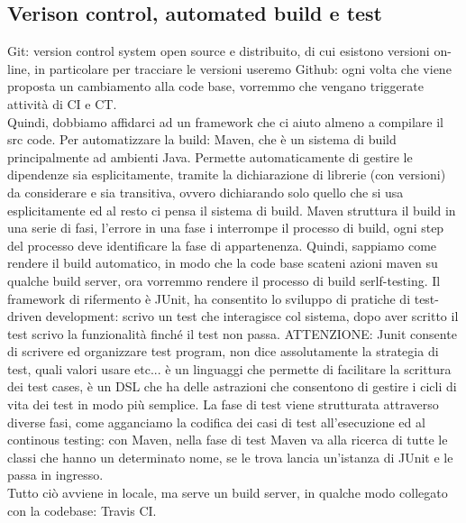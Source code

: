 \documentclass{article}
\begin{document}
\subsection{Verison control, automated build e test}
Git: version control system open source e distribuito, di cui esistono versioni on-line, in particolare per tracciare le versioni useremo Github: ogni volta che viene proposta un cambiamento alla code base, vorremmo che vengano triggerate attività di CI e CT.\\ Quindi, dobbiamo affidarci ad un framework che ci aiuto almeno a compilare il src code. Per automatizzare la build: Maven, che è un sistema di build principalmente ad ambienti Java. Permette automaticamente di gestire le dipendenze sia esplicitamente, tramite la dichiarazione di librerie (con versioni) da considerare e sia transitiva, ovvero dichiarando solo quello che si usa esplicitamente ed al resto ci pensa il sistema di build. Maven struttura il build in una serie di fasi, l'errore in una fase i interrompe il processo di build, ogni step del processo deve identificare la fase di appartenenza. Quindi, sappiamo come rendere il build automatico, in modo che la code base scateni azioni maven su qualche build server, ora vorremmo rendere il processo di build serlf-testing. Il framework di rifermento è JUnit, ha consentito lo sviluppo di pratiche di test-driven development: scrivo un test che interagisce col sistema, dopo aver scritto il test scrivo la funzionalità finché il test non passa. ATTENZIONE: Junit consente di scrivere ed organizzare test program, non dice assolutamente la strategia di test, quali valori usare etc... è un linguaggi che permette di facilitare la scrittura dei test cases, è un DSL che ha delle astrazioni che consentono di gestire i cicli di vita dei test in modo più semplice. La fase di test viene strutturata attraverso diverse fasi, come agganciamo la codifica dei casi di test all'esecuzione ed al continous testing: con Maven, nella fase di test Maven va alla ricerca di tutte le classi che hanno un determinato nome, se le trova lancia un'istanza di JUnit e le passa in ingresso.\\ Tutto ciò avviene in locale, ma serve un build server, in qualche modo collegato con la codebase: Travis CI.
\end{document}
